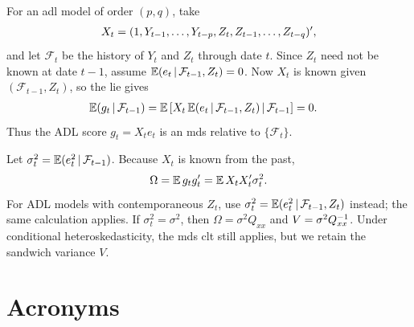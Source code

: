 \documentclass[a4paper,12pt]{article}
\begin{document}
\begin{remark}
	For an \gls{adl} model of order $(p,q)$, take
	\begin{align*}
		X_t=(1,Y_{t-1},\ldots,Y_{t-p},Z_t,Z_{t-1},\ldots,Z_{t-q})^{\prime},
	\end{align*}
	and let $\mathcal F_t$ be the history of $Y_t$ and $Z_t$ through date $t$.
	Since $Z_t$ need not be known at date $t-1$, assume
	$\operatorname{\mathbb{E}}(e_t\mathpunct{}|\mathpunct{}\mathcal F_{t-1},Z_t)=0$.
	Now $X_t$ is known given $(\mathcal F_{t-1},Z_t)$, so the \gls{lie} gives
	\begin{align*}
		\operatorname{\mathbb{E}}(g_t\mathpunct{}|\mathpunct{}\mathcal F_{t-1})
		&=\operatorname{\mathbb{E}}\left[X_t\operatorname{\mathbb{E}}(e_t\mathpunct{}|\mathpunct{}\mathcal F_{t-1},Z_t)\mathpunct{}|\mathpunct{}\mathcal F_{t-1}\right]=0.
	\end{align*}
	Thus the ADL score $g_t=X_te_t$ is an \gls{mds} relative to $\{\mathcal F_t\}$.
\end{remark}

\begin{remark}
	Let $\sigma_t^2=\operatorname{\mathbb{E}}(e_t^2\mathpunct{}|\mathpunct{}\mathcal F_{t-1})$.
	Because $X_t$ is known from the past,
	\begin{align}
		\Omega=\operatorname{\mathbb{E}} g_tg_t^{\prime} = \operatorname{\mathbb{E}} X_tX_t^{\prime}\sigma_t^2.
	\end{align}
	For ADL models with contemporaneous $Z_t$, use $\sigma_t^2=\operatorname{\mathbb{E}}(e_t^2\mathpunct{}|\mathpunct{}\mathcal F_{t-1},Z_t)$ instead;
	the same calculation applies.
	If $\sigma_t^2=\sigma^2$, then $\Omega=\sigma^2Q_{xx}$ and $V=\sigma^2Q_{xx}^{-1}$.
	Under conditional heteroskedasticity, the \gls{mds} \gls{clt} still applies,
	but we retain the sandwich variance $V$.
\end{remark}

\vfill
\section*{Acronyms}
\printglossaries
\end{document}

